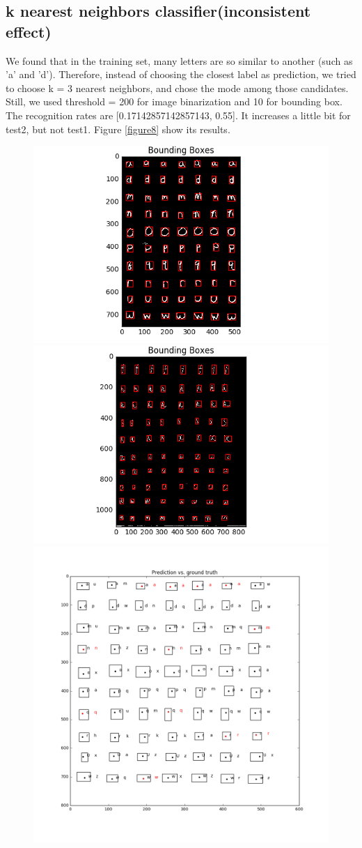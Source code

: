 \documentclass{extarticle}
\theoremstyle{definition}
\theoremstyle{definition}
\begin{document}
\subsection{k nearest neighbors classifier(inconsistent effect)}
We found that in the training set, many letters are so similar to another (such as 'a' and 'd'). Therefore, instead of choosing the closest label as prediction, we tried to choose k = 3 nearest neighbors, and chose the mode among those candidates. Still, we used threshold = 200 for image binarization and 10 for bounding box. The recognition rates are [0.17142857142857143, 0.55]. It increases a little bit for test2, but not test1. Figure \ref{figure8} show its results.\\
\begin{figure}[H]
	\includegraphics[width = 0.5\linewidth]{./figures/test1_Bounding_Boxes_improve_knn.png}
	\includegraphics[width = 0.5\linewidth]{./figures/test2_Bounding_Boxes_improve_knn.png}
	\includegraphics[width = 0.5\linewidth]{./figures/test1_gt_Prediction_vs_ground_truth_improve_knn.png}

\end{figure}
\end{document}
